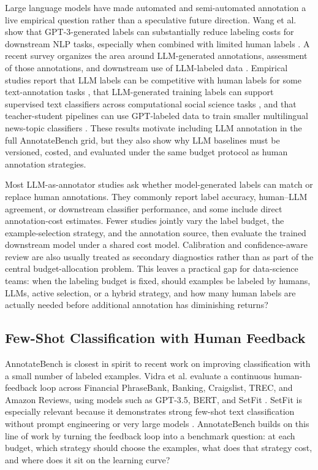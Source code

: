 \documentclass[11pt]{article}
\begin{document}
Large language models have made automated and semi-automated annotation a live empirical question rather than a speculative future direction. Wang et al. show that GPT-3-generated labels can substantially reduce labeling costs for downstream NLP tasks, especially when combined with limited human labels \citep{wang2021gpt3labeling}. A recent survey organizes the area around LLM-generated annotations, assessment of those annotations, and downstream use of LLM-labeled data \citep{tan2024llmannotation}. Empirical studies report that LLM labels can be competitive with human labels for some text-annotation tasks \citep{gilardi2023chatgpt}, that LLM-generated training labels can support supervised text classifiers across computational social science tasks \citep{pangakis2024distillation}, and that teacher-student pipelines can use GPT-labeled data to train smaller multilingual news-topic classifiers \citep{kuzman2024teacherstudent}. These results motivate including LLM annotation in the full AnnotateBench grid, but they also show why LLM baselines must be versioned, costed, and evaluated under the same budget protocol as human annotation strategies.

Most LLM-as-annotator studies ask whether model-generated labels can match or replace human annotations. They commonly report label accuracy, human--LLM agreement, or downstream classifier performance, and some include direct annotation-cost estimates. Fewer studies jointly vary the label budget, the example-selection strategy, and the annotation source, then evaluate the trained downstream model under a shared cost model. Calibration and confidence-aware review are also usually treated as secondary diagnostics rather than as part of the central budget-allocation problem. This leaves a practical gap for data-science teams: when the labeling budget is fixed, should examples be labeled by humans, LLMs, active selection, or a hybrid strategy, and how many human labels are actually needed before additional annotation has diminishing returns?

\subsection{Few-Shot Classification with Human Feedback}

AnnotateBench is closest in spirit to recent work on improving classification with a small number of labeled examples. Vidra et al. evaluate a continuous human-feedback loop across Financial PhraseBank, Banking, Craigslist, TREC, and Amazon Reviews, using models such as GPT-3.5, BERT, and SetFit \citep{vidra2024humanfeedback}. SetFit is especially relevant because it demonstrates strong few-shot text classification without prompt engineering or very large models \citep{tunstall2022setfit}. AnnotateBench builds on this line of work by turning the feedback loop into a benchmark question: at each budget, which strategy should choose the examples, what does that strategy cost, and where does it sit on the learning curve?
\end{document}

